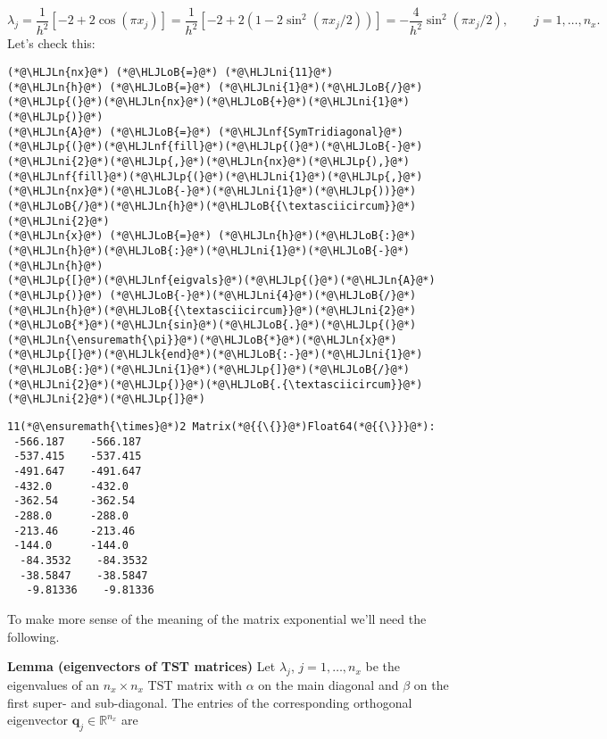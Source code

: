 \documentclass[12pt,a4paper]{article}
\newcommand{\HLJLk}[1]{\textcolor[RGB]{148,91,176}{\textbf{#1}}}
\newcommand{\HLJLn}[1]{#1}
\newcommand{\HLJLnf}[1]{\textcolor[RGB]{66,102,213}{#1}}
\newcommand{\HLJLni}[1]{\textcolor[RGB]{59,151,46}{#1}}
\newcommand{\HLJLoB}[1]{\textcolor[RGB]{102,102,102}{\textbf{#1}}}
\newcommand{\HLJLp}[1]{#1}
\begin{document}
\[
\lambda_j = \frac{1}{h^2}\left[-2 + 2\cos\left(\pi x_j  \right)  \right] = \frac{1}{h^2}\left[-2 + 2\left(1 - 2\sin^2\left(\pi x_j/2  \right)\right)  \right] = -\frac{4}{h^2}\sin^2(\pi x_j/2), \qquad j = 1, \ldots, n_x.
\]
Let's check this:


\begin{lstlisting}
(*@\HLJLn{nx}@*) (*@\HLJLoB{=}@*) (*@\HLJLni{11}@*)
(*@\HLJLn{h}@*) (*@\HLJLoB{=}@*) (*@\HLJLni{1}@*)(*@\HLJLoB{/}@*)(*@\HLJLp{(}@*)(*@\HLJLn{nx}@*)(*@\HLJLoB{+}@*)(*@\HLJLni{1}@*)(*@\HLJLp{)}@*)
(*@\HLJLn{A}@*) (*@\HLJLoB{=}@*) (*@\HLJLnf{SymTridiagonal}@*)(*@\HLJLp{(}@*)(*@\HLJLnf{fill}@*)(*@\HLJLp{(}@*)(*@\HLJLoB{-}@*)(*@\HLJLni{2}@*)(*@\HLJLp{,}@*)(*@\HLJLn{nx}@*)(*@\HLJLp{),}@*)(*@\HLJLnf{fill}@*)(*@\HLJLp{(}@*)(*@\HLJLni{1}@*)(*@\HLJLp{,}@*)(*@\HLJLn{nx}@*)(*@\HLJLoB{-}@*)(*@\HLJLni{1}@*)(*@\HLJLp{))}@*)(*@\HLJLoB{/}@*)(*@\HLJLn{h}@*)(*@\HLJLoB{{\textasciicircum}}@*)(*@\HLJLni{2}@*)
(*@\HLJLn{x}@*) (*@\HLJLoB{=}@*) (*@\HLJLn{h}@*)(*@\HLJLoB{:}@*)(*@\HLJLn{h}@*)(*@\HLJLoB{:}@*)(*@\HLJLni{1}@*)(*@\HLJLoB{-}@*)(*@\HLJLn{h}@*)
(*@\HLJLp{[}@*)(*@\HLJLnf{eigvals}@*)(*@\HLJLp{(}@*)(*@\HLJLn{A}@*)(*@\HLJLp{)}@*) (*@\HLJLoB{-}@*)(*@\HLJLni{4}@*)(*@\HLJLoB{/}@*)(*@\HLJLn{h}@*)(*@\HLJLoB{{\textasciicircum}}@*)(*@\HLJLni{2}@*)(*@\HLJLoB{*}@*)(*@\HLJLn{sin}@*)(*@\HLJLoB{.}@*)(*@\HLJLp{(}@*)(*@\HLJLn{\ensuremath{\pi}}@*)(*@\HLJLoB{*}@*)(*@\HLJLn{x}@*)(*@\HLJLp{[}@*)(*@\HLJLk{end}@*)(*@\HLJLoB{:-}@*)(*@\HLJLni{1}@*)(*@\HLJLoB{:}@*)(*@\HLJLni{1}@*)(*@\HLJLp{]}@*)(*@\HLJLoB{/}@*)(*@\HLJLni{2}@*)(*@\HLJLp{)}@*)(*@\HLJLoB{.{\textasciicircum}}@*)(*@\HLJLni{2}@*)(*@\HLJLp{]}@*)
\end{lstlisting}

\begin{lstlisting}
11(*@\ensuremath{\times}@*)2 Matrix(*@{{\{}}@*)Float64(*@{{\}}}@*):
 -566.187    -566.187
 -537.415    -537.415
 -491.647    -491.647
 -432.0      -432.0
 -362.54     -362.54
 -288.0      -288.0
 -213.46     -213.46
 -144.0      -144.0
  -84.3532    -84.3532
  -38.5847    -38.5847
   -9.81336    -9.81336
\end{lstlisting}


To make more sense of the meaning of the matrix exponential we'll need the following.

\textbf{Lemma (eigenvectors of TST matrices)}  Let $\lambda_j$, $j = 1, \ldots, n_x$ be the eigenvalues of an $n_x \times n_x$ TST matrix with $\alpha$ on the main diagonal and $\beta$ on the first super- and sub-diagonal.  The entries of the corresponding orthogonal eigenvector $\mathbf{q}_j \in \mathbb{R}^{n_x}$ are
\end{document}
